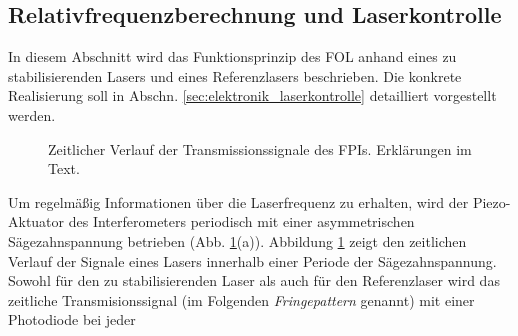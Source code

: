 \subsection{Relativfrequenzberechnung
und Laserkontrolle}\label{subsec:relativfrequenzberechnung_und_laserkontrolle}
In diesem Abschnitt wird das Funktionsprinzip des FOL anhand
eines zu stabilisierenden Lasers und eines Referenzlasers beschrieben. Die
konkrete Realisierung soll in Abschn. \ref{sec:elektronik_laserkontrolle}
detailliert vorgestellt werden.\par
\begin{figure}[h]
 	\centering
	\caption[Zeitlicher Verlauf
	FPI-Transmission]{Zeitlicher Verlauf der
	Transmissionssignale des FPIs. Erklärungen im Text.}
	\label{fig:FPI_signal-zeitverlauf}
\end{figure}
Um regelmäßig Informationen über die Laserfrequenz zu erhalten, wird der
Piezo-Aktuator des Interferometers periodisch mit einer asymmetrischen
Sägezahnspannung betrieben (Abb. \ref{fig:FPI_signal-zeitverlauf}(a)). Abbildung
\ref{fig:FPI_signal-zeitverlauf} zeigt den zeitlichen Verlauf der Signale eines
Lasers innerhalb einer Periode der Sägezahnspannung. Sowohl für den zu
stabilisierenden Laser als auch für den Referenzlaser wird das zeitliche Transmisionssignal (im
Folgenden \textit{Fringepattern} genannt) mit einer Photodiode bei jeder
